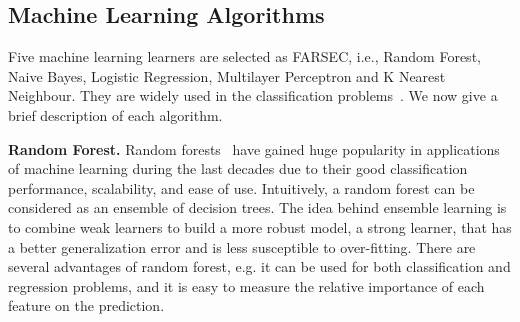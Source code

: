 
\subsection{Machine Learning Algorithms}
Five machine learning learners are selected as FARSEC, i.e., Random Forest, Naive Bayes, Logistic Regression, Multilayer Perceptron and K Nearest Neighbour. They are widely used in the classification problems~\cite{lessmann2008benchmarking}. We now give a brief description of each algorithm.

\textbf{Random Forest.} Random forests~\cite{liaw2002classification} have gained huge popularity in applications of machine learning during the last decades due to their good classification performance, scalability, and ease of use. Intuitively, a random forest can be considered as an ensemble of decision trees. The idea behind ensemble learning is to combine weak learners to build a more robust model, a strong learner, that has a better generalization error and is less susceptible to over-fitting. There are several advantages of random forest, e.g. it can be used for both classification and regression problems, and it is easy to measure the relative importance of each feature on the prediction.

